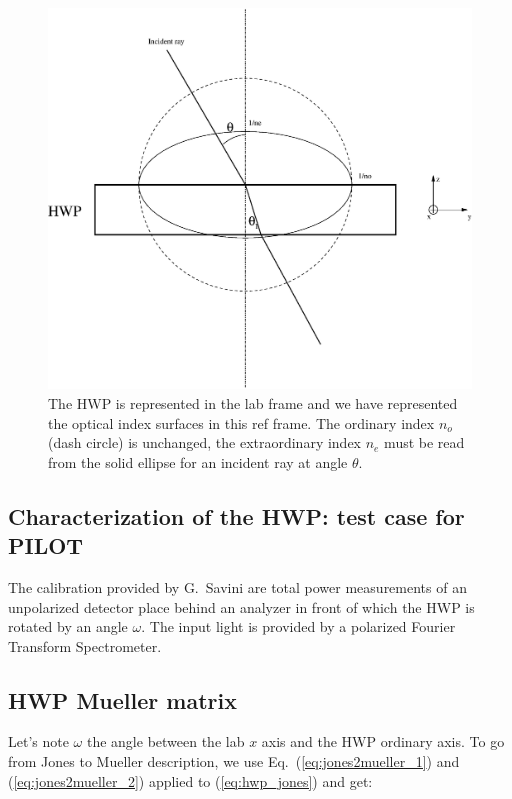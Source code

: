 \documentclass[a4paper,10pt]{article}
\begin{document}
\begin{figure}
\begin{center}
\includegraphics[clip, angle=0, scale = 0.5]{hwp_opt_surf.eps}
\caption{The HWP is represented in the lab frame and we have represented the
  optical index surfaces in this ref frame. The ordinary index $n_o$ (dash
  circle) is unchanged, the extraordinary index $n_e$ must be read from the
  solid ellipse for an incident ray at angle $\theta$.}
\label{fig:opt_ind_surf}
\end{center}
\end{figure}

\subsection{Characterization of the HWP: test case for PILOT}

The calibration provided by G.~Savini are total power measurements of an
unpolarized detector place behind an analyzer in front of which the HWP is
rotated by an angle $\omega$. The input light is provided by a polarized Fourier Transform
Spectrometer.

\subsection{HWP Mueller matrix}

Let's note $\omega$ the angle between the lab $x$ axis and the HWP ordinary
axis. To go from Jones to Mueller description, we use Eq.~(\ref{eq:jones2mueller_1})
and (\ref{eq:jones2mueller_2}) applied to (\ref{eq:hwp_jones}) and get:
\end{document}
